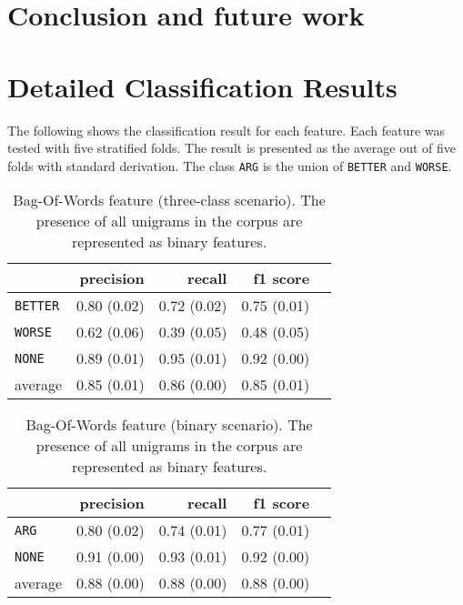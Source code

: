 \chapter{Conclusion and future work}

\appendix
	\chapter{Detailed Classification Results}

	\setcounter{section}{1}
	The following shows the classification result for each feature. Each feature was tested with five stratified folds. The result is presented as the average out of five folds with standard derivation. The class \texttt{ARG} is the union of \texttt{BETTER} and \texttt{WORSE}.
	

	
	\begin{table}[h] 
		\centering 
		\caption{Bag-Of-Words feature (three-class scenario). The presence of all unigrams in the corpus are represented as binary features.} 
		\label{  }
		\begin{tabular}{@{}lrrrr@{}}
			\toprule
			        & precision                & recall                   & f1 score                 \\ \midrule 
			\texttt{BETTER}  & 0.80 \scriptsize{(0.02)} & 0.72 \scriptsize{(0.02)} & 0.75 \scriptsize{(0.01)} \\ 
			\texttt{WORSE}   & 0.62 \scriptsize{(0.06)} & 0.39 \scriptsize{(0.05)} & 0.48 \scriptsize{(0.05)} \\ 
			\texttt{NONE}    & 0.89 \scriptsize{(0.01)} & 0.95 \scriptsize{(0.01)} & 0.92 \scriptsize{(0.00)} \\ 
			average & 0.85 \scriptsize{(0.01)} & 0.86 \scriptsize{(0.00)} & 0.85 \scriptsize{(0.01)} \\ 
			\bottomrule
		\end{tabular}
	\end{table}
	
	
	\begin{table}[h] 
		\centering 
		\caption{Bag-Of-Words feature (binary scenario). The presence of all unigrams in the corpus are represented as binary features.} 
		\label{  }
		\begin{tabular}{@{}lrrrr@{}}
			\toprule
			        & precision                & recall                   & f1 score                 \\ \midrule 
			\texttt{ARG}     & 0.80 \scriptsize{(0.02)} & 0.74 \scriptsize{(0.01)} & 0.77 \scriptsize{(0.01)} \\ 
			\texttt{NONE}    & 0.91 \scriptsize{(0.00)} & 0.93 \scriptsize{(0.01)} & 0.92 \scriptsize{(0.00)} \\ 
			average & 0.88 \scriptsize{(0.00)} & 0.88 \scriptsize{(0.00)} & 0.88 \scriptsize{(0.00)} \\ 
			\bottomrule
		\end{tabular}
	\end{table}
	
